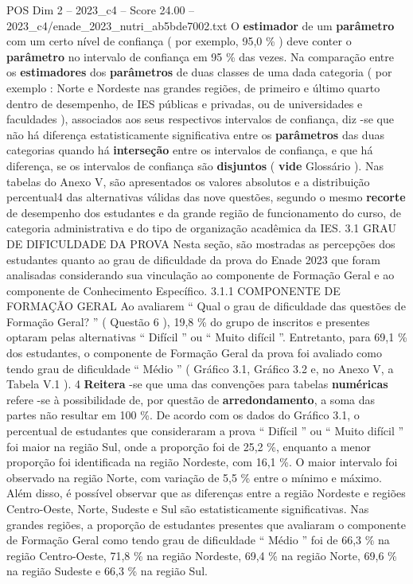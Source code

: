 \begin{textsample}{POS Dim 2 – 2023\_c4 – Score 24.00 – 2023\_c4/enade\_2023\_nutri\_ab5bde7002.txt}
O \textbf{estimador} de um \textbf{parâmetro} com um certo nível de confiança ( por exemplo, 95,0 \% ) deve conter o \textbf{parâmetro} no intervalo de confiança em 95 \% das vezes.
Na comparação entre os \textbf{estimadores} dos \textbf{parâmetros} de duas classes de uma dada categoria ( por exemplo : Norte e Nordeste nas grandes regiões, de primeiro e último quarto dentro de desempenho, de IES públicas e privadas, ou de universidades e faculdades ), associados aos seus respectivos intervalos de confiança, diz -se que não há diferença estatisticamente significativa entre os \textbf{parâmetros} das duas categorias quando há \textbf{interseção} entre os intervalos de confiança, e que há diferença, se os intervalos de confiança são \textbf{disjuntos} ( \textbf{vide} Glossário ).
Nas tabelas do Anexo V, são apresentados os valores absolutos e a distribuição percentual4 das alternativas válidas das nove questões, segundo o mesmo \textbf{recorte} de desempenho dos estudantes e da grande região de funcionamento do curso, de categoria administrativa e do tipo de organização acadêmica da IES. 3.1 GRAU DE DIFICULDADE DA PROVA Nesta seção, são mostradas as percepções dos estudantes quanto ao grau de dificuldade da prova do Enade 2023 que foram analisadas considerando sua vinculação ao componente de Formação Geral e ao componente de Conhecimento Específico. 3.1.1 COMPONENTE DE FORMAÇÃO GERAL Ao avaliarem “ Qual o grau de dificuldade das questões de Formação Geral? ” ( Questão 6 ), 19,8 \% do grupo de inscritos e presentes optaram pelas alternativas “ Difícil ” ou “ Muito difícil ”.
Entretanto, para 69,1 \% dos estudantes, o componente de Formação Geral da prova foi avaliado como tendo grau de dificuldade “ Médio ” ( Gráfico 3.1, Gráfico 3.2 e, no Anexo V, a Tabela V.1 ). 4 \textbf{Reitera} -se que uma das convenções para tabelas \textbf{numéricas} refere -se à possibilidade de, por questão de \textbf{arredondamento}, a soma das partes não resultar em 100 \%.
De acordo com os dados do Gráfico 3.1, o percentual de estudantes que consideraram a prova “ Difícil ” ou “ Muito difícil ” foi maior na região Sul, onde a proporção foi de 25,2 \%, enquanto a menor proporção foi identificada na região Nordeste, com 16,1 \%.
O maior intervalo foi observado na região Norte, com variação de 5,5 \% entre o mínimo e máximo.
Além disso, é possível observar que as diferenças entre a região Nordeste e regiões Centro-Oeste, Norte, Sudeste e Sul são estatisticamente significativas.
Nas grandes regiões, a proporção de estudantes presentes que avaliaram o componente de Formação Geral como tendo grau de dificuldade “ Médio ” foi de 66,3 \% na região Centro-Oeste, 71,8 \% na região Nordeste, 69,4 \% na região Norte, 69,6 \% na região Sudeste e 66,3 \% na região Sul.

\end{textsample}
